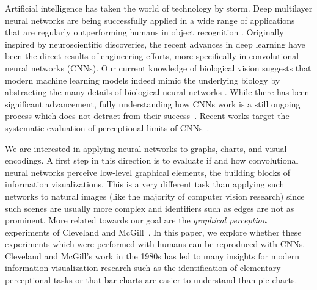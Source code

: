 
\maketitle

Artificial intelligence has taken the world of technology by storm. Deep multilayer neural networks are being successfully applied in a wide range of applications that are regularly outperforming humans in object recognition \cite{krizhevsky_imagenet2012, simonyan_very_deep2014,szegedy2015}. 
Originally inspired by neuroscientific discoveries, the recent advances in deep learning have been the direct results of engineering efforts, more specifically in convolutional neural networks (CNNs). Our current knowledge of biological vision suggests that modern machine learning models indeed mimic the underlying biology by abstracting the many details of biological neural networks \cite{yamins2016using, hassabis2017neuroscience, human_vs_machine_vision}.
While there has been significant advancement, fully understanding how CNNs work is a still ongoing process which does not detract from their success~\cite{goodfellow_book, deeplearning_blackbox2017}. Recent works target the systematic evaluation of perceptional limits of CNNs~\cite{clevr, not_so_clevr}.

We are interested in applying neural networks to graphs, charts, and visual encodings. A first step in this direction is to evaluate if and how convolutional neural networks perceive low-level graphical elements, the building blocks of information visualizations. This is a very different task than applying such networks to natural images (like the majority of computer vision research) since such scenes are usually more complex and identifiers such as edges are not as prominent. More related towards our goal are the \emph{graphical perception} experiments of Cleveland and McGill~\cite{cleveland_mcgill}. In this paper, we explore whether these experiments which were performed with humans can be reproduced with CNNs. Cleveland and McGill's work in the 1980s has led to many insights for modern information visualization research such as the identification of elementary perceptional tasks or that bar charts are easier to understand than pie charts. 

